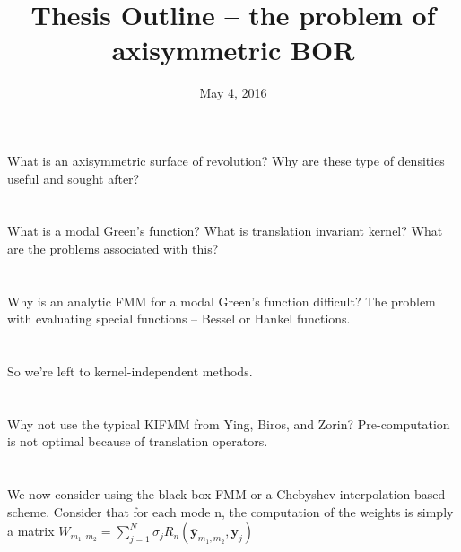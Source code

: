 \documentclass[11pt, oneside]{article}   	%
\title{Thesis Outline -- the problem of axisymmetric BOR}
\date{May 4, 2016}
\begin{document}
\maketitle

\section{}
What is an axisymmetric surface of revolution? Why are these type of densities useful and sought after?
\section{}
What is a modal Green's function? What is translation invariant kernel? What are the problems associated with this?
\section{}
Why is an analytic FMM for a modal Green's function difficult? The problem with evaluating special functions -- Bessel or Hankel functions.
\section{}
So we're left to kernel-independent methods.
\section{}
Why not use the typical KIFMM from Ying, Biros, and Zorin? Pre-computation is not optimal because of translation operators.
\section{}
We now consider using the black-box FMM or a Chebyshev interpolation-based scheme. Consider that for each mode n, the computation of the weights is simply a matrix
$W_{m_1,m_2}=\sum_{j=1}^N \sigma_j R_n(\mathbf{\overline{y}}_{m_1,m_2},\mathbf{y}_j)$
\end{document}
